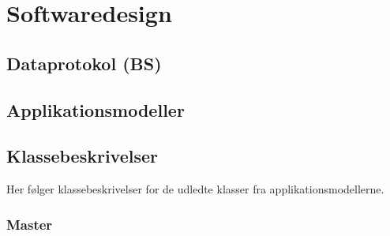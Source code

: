 \chapter{Softwaredesign}

\section{Dataprotokol (BS)}


\section{Applikationsmodeller}


\section{Klassebeskrivelser}
Her følger klassebeskrivelser for de udledte klasser fra applikationsmodellerne.

\subsection{Master}


